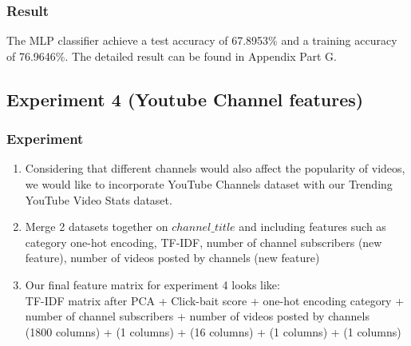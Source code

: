 \documentclass[english]{article}
\begin{document}
\subsubsection{Result}
The MLP classifier achieve a test accuracy of 67.8953\% and a training accuracy of 76.9646\%. The detailed result can be found in Appendix Part G.


\subsection{Experiment 4 (Youtube Channel features)}
\subsubsection{Experiment}
\begin{enumerate}
\item Considering that different channels would also affect the popularity of videos, we would like to incorporate YouTube Channels dataset with our Trending YouTube Video Stats dataset.
\item Merge 2 datasets together on $channel\_title$ and including features such as category one-hot encoding, TF-IDF, number of channel subscribers (new feature), number of videos posted by channels (new feature)

\item Our final feature matrix for experiment 4 looks like: \\
    TF-IDF matrix after PCA  + Click-bait score  + one-hot encoding category + number of channel subscribers + number of videos posted by channels \\
    (1800 columns) + (1 columns)  +  (16 columns) + (1 columns) + (1 columns) 
\end{enumerate}
\end{document}
